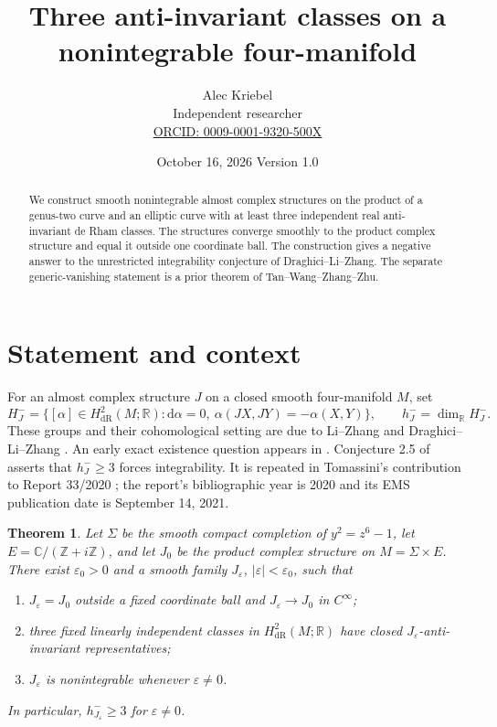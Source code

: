\documentclass[11pt]{article}
\title{Three anti-invariant classes on a\\ nonintegrable four-manifold}
\author{Alec Kriebel\\
 \small Independent researcher\\
 \small\href{https://orcid.org/0009-0001-9320-500X}{ORCID: 0009-0001-9320-500X}}
\date{October 16, 2026 \quad Version 1.0}
\newtheorem{theorem}{Theorem}
\newcommand{\R}{\mathbb R}
\newcommand{\C}{\mathbb C}
\newcommand{\Z}{\mathbb Z}
\newcommand{\dd}{\mathrm d}
\begin{document}
\maketitle

\begin{abstract}
We construct smooth nonintegrable almost complex structures on the product
of a genus-two curve and an elliptic curve with at least three independent
real anti-invariant de Rham classes. The structures converge smoothly to the
product complex structure and equal it outside one coordinate ball.
The construction gives a negative answer to the unrestricted integrability
conjecture of Draghici--Li--Zhang. The separate generic-vanishing statement is
a prior theorem of Tan--Wang--Zhang--Zhu.
\end{abstract}

\section{Statement and context}
For an almost complex structure $J$ on a closed smooth four-manifold $M$, set
\[
 H_J^-=\{[\alpha]\in H^2_{\mathrm{dR}}(M;\R):
          \dd\alpha=0,\ \alpha(JX,JY)=-\alpha(X,Y)\},\qquad
 h_J^-=\dim_\R H_J^- .
\]
These groups and their cohomological setting are due to Li--Zhang and
Draghici--Li--Zhang \cite{LZ,DLZ08,DLZ}.
An early exact existence question appears in \cite[Question 3.27]{DLZ08}.
Conjecture 2.5 of \cite{DLZ} asserts that $h_J^-\geq3$ forces integrability.
It is repeated in Tomassini's contribution to Report 33/2020
\cite[p.~1687]{OWR}; the report's bibliographic year is 2020 and its EMS
publication date is September 14, 2021.

\begin{theorem}\label{thm}
Let $\Sigma$ be the smooth compact completion of $y^2=z^6-1$, let
$E=\C/(\Z+i\Z)$, and let $J_0$ be the product complex structure on
$M=\Sigma\times E$. There exist $\varepsilon_0>0$ and a smooth family
$J_\varepsilon$, $|\varepsilon|<\varepsilon_0$, such that
\begin{enumerate}
\item $J_\varepsilon=J_0$ outside a fixed coordinate ball and
      $J_\varepsilon\longrightarrow J_0$ in $C^\infty$;
\item three fixed linearly independent classes in $H^2_{\mathrm{dR}}(M;\R)$
      have closed $J_\varepsilon$-anti-invariant representatives;
\item $J_\varepsilon$ is nonintegrable whenever $\varepsilon\ne0$.
\end{enumerate}
In particular, $h_{J_\varepsilon}^-\geq3$ for $\varepsilon\ne0$.
\end{theorem}
\end{document}
